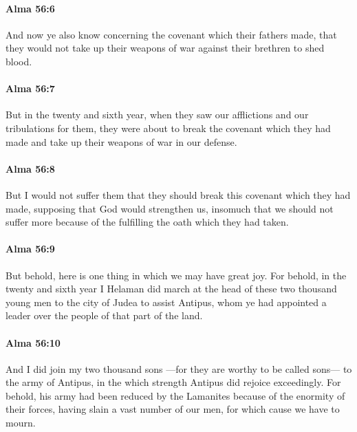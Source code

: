 		\paragraph{Alma 56:6} %
			\label{ALMA-56-6}

			And now ye also know concerning the covenant which their fathers made,
			that they would not take up their weapons of war
			against their brethren to shed blood.

		\paragraph{Alma 56:7} %
			\label{ALMA-56-7}

			But in the twenty and sixth year,
			when they saw our afflictions and our tribulations for them,
			they were about to break the covenant which they had made
			and take up their weapons of war in our defense.

		\paragraph{Alma 56:8} %
			\label{ALMA-56-8}

			But I would not suffer them
			that they should break this covenant which they had made,
			supposing that God would strengthen us,
			insomuch that we should not suffer more
			because of the fulfilling the oath which they had taken.

		\paragraph{Alma 56:9} %
			\label{ALMA-56-9}

			But behold, here is one thing in which we may have great joy.
			For behold, in the twenty and sixth year
			I Helaman did march at the head of these two thousand young men
			to the city of Judea to assist Antipus,
			whom ye had appointed a leader over the people of that part of the land.

		\paragraph{Alma 56:10} %
			\label{ALMA-56-10}

			And I did join my two thousand sons
			---for they are worthy to be called sons---
			to the army of Antipus,
			in the which strength Antipus did rejoice exceedingly.
			For behold, his army had been reduced by the Lamanites
			because of the enormity of their forces,
			having slain a vast number of our men,
			for which cause we have to mourn.


